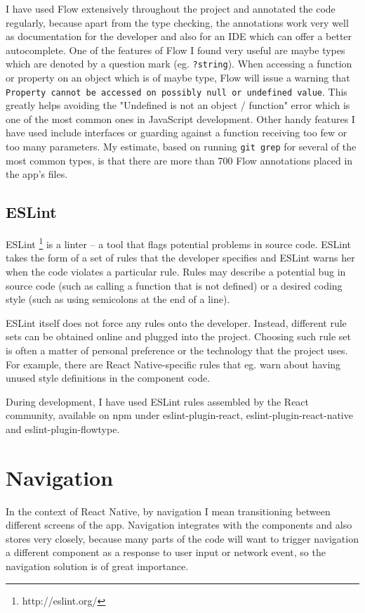 I have used Flow extensively throughout the project and annotated the code regularly, because apart from the type checking, the annotations work very well as documentation for the developer and also for an IDE which can offer a better autocomplete. One of the features of Flow I found very useful are maybe types which are denoted by a question mark (eg. \texttt{?string}). When accessing a function or property on an object which is of maybe type, Flow will issue a warning that \texttt{Property cannot be accessed on possibly null or undefined value}. This greatly helps avoiding the "Undefined is not an object / function" error which is one of the most common ones in JavaScript development. Other handy features I have used include interfaces or guarding against a function receiving too few or too many parameters. My estimate, based on running \texttt{git grep} for several of the most common types, is that there are more than 700 Flow annotations placed in the app's files.

\subsection{ESLint}

ESLint  \footnote{http://eslint.org/}  is a linter -- a tool that flags potential problems in source code. ESLint takes the form of a set of rules that the developer specifies and ESLint warns her when the code violates a particular rule. Rules may describe a potential bug in source code (such as calling a function that is not defined) or a desired coding style (such as using semicolons at the end of a line).

ESLint itself does not force any rules onto the developer. Instead, different rule sets can be obtained online and plugged into the project. Choosing such rule set is often a matter of personal preference or the technology that the project uses. For example, there are React Native-specific rules that eg. warn about having unused style definitions in the component code. 

During development, I have used ESLint rules assembled by the React community, available on npm under eslint-plugin-react, eslint-plugin-react-native and eslint-plugin-flowtype.


\section{Navigation}

In the context of React Native, by navigation I mean transitioning between different screens of the app. Navigation integrates with the components and also stores very closely, because many parts of the code will want to trigger navigation a different component as a response to user input or network event, so the navigation solution is of great importance. 

